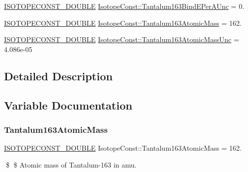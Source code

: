 \begin{DoxyCompactItemize}
\mbox{\hyperlink{group___isotope_const-_macros_ga8f45a7272ce02c0b4c65c44636ed719a}{I\+S\+O\+T\+O\+P\+E\+C\+O\+N\+S\+T\+\_\+\+D\+O\+U\+B\+LE}} \mbox{\hyperlink{group___isotope_const-_tantalum-_ta163_gaca46713ae92c4a73904b550c9e37024f}{Isotope\+Const\+::\+Tantalum163\+Bind\+E\+Per\+A\+Unc}} = 0.
\item 
\mbox{\hyperlink{group___isotope_const-_macros_ga8f45a7272ce02c0b4c65c44636ed719a}{I\+S\+O\+T\+O\+P\+E\+C\+O\+N\+S\+T\+\_\+\+D\+O\+U\+B\+LE}} \mbox{\hyperlink{group___isotope_const-_tantalum-_ta163_ga520a29f5985ab500a1e7246c4fc82dbc}{Isotope\+Const\+::\+Tantalum163\+Atomic\+Mass}} = 162.
\item 
\mbox{\hyperlink{group___isotope_const-_macros_ga8f45a7272ce02c0b4c65c44636ed719a}{I\+S\+O\+T\+O\+P\+E\+C\+O\+N\+S\+T\+\_\+\+D\+O\+U\+B\+LE}} \mbox{\hyperlink{group___isotope_const-_tantalum-_ta163_gad745f6e25502ab3e7d38655a6ef33669}{Isotope\+Const\+::\+Tantalum163\+Atomic\+Mass\+Unc}} = 4.\+086e-\/05
\end{DoxyCompactItemize}


\subsection{Detailed Description}


\subsection{Variable Documentation}
\mbox{\label{group___isotope_const-_tantalum-_ta163_ga520a29f5985ab500a1e7246c4fc82dbc}} 
\subsubsection{\texorpdfstring{Tantalum163\+Atomic\+Mass}{Tantalum163AtomicMass}}
{\footnotesize\ttfamily \mbox{\hyperlink{group___isotope_const-_macros_ga8f45a7272ce02c0b4c65c44636ed719a}{I\+S\+O\+T\+O\+P\+E\+C\+O\+N\+S\+T\+\_\+\+D\+O\+U\+B\+LE}} Isotope\+Const\+::\+Tantalum163\+Atomic\+Mass = 162.}

\$ \$ Atomic mass of Tantalum-\/163 in amu. \mbox{\label{group___isotope_const-_tantalum-_ta163_gad745f6e25502ab3e7d38655a6ef33669}} 
